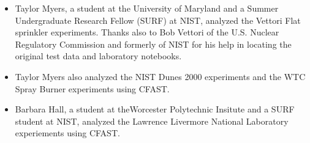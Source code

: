 \documentclass[12pt]{book}
\begin{document}
\begin{itemize}
\item Taylor Myers, a student at the University of Maryland and a Summer Undergraduate Research Fellow (SURF) at NIST, analyzed the Vettori Flat sprinkler experiments. Thanks also to Bob Vettori of the U.S. Nuclear Regulatory Commission and formerly of NIST for his help in locating the original test data and laboratory notebooks.

\item Taylor Myers also analyzed the NIST Dunes 2000 experiments and the WTC Spray Burner experiments using CFAST.

\item Barbara Hall, a student at theWorcester Polytechnic Insitute and a SURF student at NIST, analyzed the Lawrence Livermore National Laboratory experiements using CFAST.

\end{itemize}

\tableofcontents

\listoffigures

\listoftables

\mainmatter








%










\appendix
{}




\end{document}
